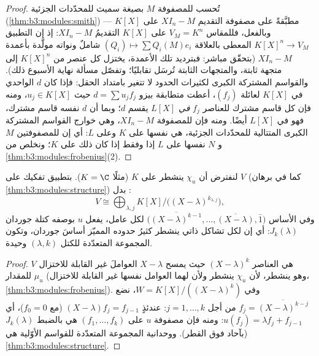 \begin{proof}
تُحسب  للمصفوفة $M$ بصيغة سميث للمحدّدات الجزئية
(\cref{thm:b3:modules:smith}) مطبَّقةً على مصفوفة التقديم $XI_n - M$ على $K[X]$
--- وبالفعل، فللمقاس $V_M = K^n$ على $K[X]$ التقديمُ $XI_n - M$:
إذ إن التطبيق $K[X]^n \to V_M$ المعطى بالعلاقة $(Q_i) \mapsto \sum Q_i(M)e_i$ شاملٌ ونواته
مولَّدة بأعمدة $XI_n - M$ (بتحقّق مباشر: فبترديد تلك الأعمدة،
يختزل كل عنصر من $K[X]^n$ إلى متجهة ثابتة، والمتجهات الثابتة
تُرسَل تقابليًا؛ وتفصّل مسألة نهاية الأسبوع ذلك). والقواسم
المشتركة الكبرى لكثيرات الحدود لا تتغير بامتداد الحقل: فإذا كان
$d$  الواحدي في $K[X]$ لعائلة $(f_j)$، أعطت
متطابقة بيزو $d = \sum u_jf_j$ حيث $u_j \in K[X]$، ومنه فإن كل قاسم مشترك
للعناصر $f_j$ \emph{في $L[X]$} يقسم $d$؛ وبما أن $d$ نفسه قاسم
مشترك، فهو  في $L[X]$ أيضًا. ومنه فإن
 للمصفوفة $XI_n - M$، وهي خوارج القواسم المشتركة
الكبرى المتتالية للمحدّدات الجزئية، هي نفسها على $K$ وعلى $L$:
أي إن للمصفوفتين $M$ و $N$  نفسها على $L$ إذا وفقط إذا كان
ذلك على $K$؛ ونخلص من \cref{thm:b3:modules:frobenius}(2).
\end{proof}

\begin{theorem}\label{thm:b3:modules:jordan}
لنفترض أن $\chi_u$ ينشطر على $K$ (مثلًا $K = \C$). بتطبيق تفكيك
 على $V$ (كما في برهان \cref{thm:b3:modules:structure}) بدل :
\[
V \cong \bigoplus_{\lambda, j} K[X]\big/\bigl((X -
\lambda)^{k_{\lambda,j}}\bigr),
\]
وفي الأساس $\bigl(\overline{(X-\lambda)^{k-1}}, \dots,
\overline{(X - \lambda)}, \bar 1\bigr)$ لكل عامل، يفعل $u$ بوصفه كتلة جوردان
$J_k(\lambda)$: أي إن لكل تشاكل ذاتي ينشطر كثيرُ حدوده المميّز
أساسَ جوردان، وتكون المجموعة المتعدّدة للكتل $(\lambda, k)$
وحيدة.
\end{theorem}

\begin{proof}
   $V$ هي العناصر $(X - \lambda)^k$ حيث
يمسح $X - \lambda$ العواملَ غير القابلة للاختزال للمقدار $\mu_u$ (وهو
ينشطر، لأن $\chi_u$ ينشطر ولأن لهما العوامل نفسها غير القابلة
للاختزال، \cref{thm:b3:modules:frobenius}). وفي $W = K[X]/((X-\lambda)^k)$، نضع $f_j = \overline{(X - \lambda)^{k-j}}$ من أجل $j = 1, \dots, k$:
عندئذٍ $(X - \lambda)f_j = f_{j-1}$ (مع $f_0 = 0$)، أي $u(f_j)
= \lambda f_j + f_{j-1}$: ومنه فإن مصفوفة $u$
على $(f_1, \dots,
f_k)$ هي بالضبط $J_k(\lambda)$ (بآحاد فوق القطر). ووحدانية
المجموعة المتعدّدة للقواسم الأوّلية هي \cref{thm:b3:modules:structure}.
\end{proof}

